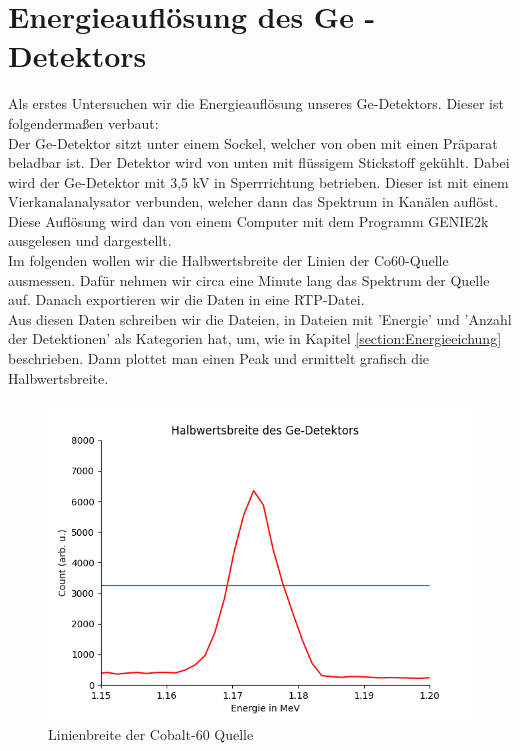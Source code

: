 \section{Energieauflösung des Ge - Detektors}

Als erstes Untersuchen wir die Energieauflösung unseres Ge-Detektors. Dieser ist folgendermaßen verbaut:\\
Der Ge-Detektor sitzt unter einem Sockel, welcher von oben mit einen Präparat beladbar ist. Der Detektor wird von unten mit flüssigem 
Stickstoff gekühlt. Dabei wird der Ge-Detektor mit 3,5 kV in Sperrrichtung betrieben. Dieser ist mit einem Vierkanalanalysator verbunden, welcher dann das 
Spektrum in Kanälen auflöst. Diese Auflösung wird dan von einem Computer mit dem Programm GENIE2k ausgelesen und dargestellt.\\
Im folgenden wollen wir die Halbwertsbreite der Linien der Co60-Quelle ausmessen. Dafür nehmen wir circa eine Minute lang das Spektrum der Quelle auf. Danach exportieren wir die Daten in eine RTP-Datei.\\

Aus diesen Daten schreiben wir die Dateien, in Dateien mit 'Energie' und 'Anzahl der Detektionen' als Kategorien hat, um, wie in Kapitel 
\ref{section:Energieeichung} beschrieben. Dann plottet man einen Peak und ermittelt grafisch die Halbwertsbreite.

\begin{figure}[ht]
    \centering
    \includegraphics[width = \linewidth]{Bilder/Auswertung/Halbwertsbreite.png}
    \caption{Linienbreite der Cobalt-60 Quelle}
    \label{bild:linienbreite}
\end{figure}

